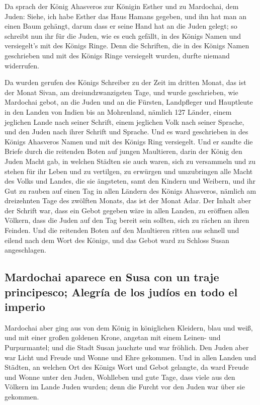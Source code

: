  Da sprach der König Ahasveros zur Königin Esther und zu
Mardochai, dem Juden: Siehe, ich habe Esther das Haus Hamans gegeben,
und ihn hat man an einen Baum gehängt, darum dass er seine Hand hat an
die Juden gelegt;  so schreibt nun ihr für die Juden, wie
es euch gefällt, in des Königs Namen und versiegelt's mit des Königs
Ringe. Denn die Schriften, die in des Königs Namen geschrieben und mit
des Königs Ringe versiegelt wurden, durfte niemand widerrufen.

 Da wurden gerufen des Königs Schreiber zu der Zeit im
dritten Monat, das ist der Monat Sivan, am dreiundzwanzigsten Tage, und
wurde geschrieben, wie Mardochai gebot, an die Juden und an die Fürsten,
Landpfleger und Hauptleute in den Landen von Indien bis an Mohrenland,
nämlich 127 Länder, einem jeglichen Lande nach seiner Schrift, einem
jeglichen Volk nach seiner Sprache, und den Juden nach ihrer Schrift und
Sprache.  Und es ward geschrieben in des Königs Ahasveros
Namen und mit des Königs Ring versiegelt. Und er sandte die Briefe durch
die reitenden Boten auf jungen Maultieren,  darin der
König den Juden Macht gab, in welchen Städten sie auch waren, sich zu
versammeln und zu stehen für ihr Leben und zu vertilgen, zu erwürgen und
umzubringen alle Macht des Volks und Landes, die sie ängsteten, samt den
Kindern und Weibern, und ihr Gut zu rauben  auf einen Tag
in allen Ländern des Königs Ahasveros, nämlich am dreizehnten Tage des
zwölften Monats, das ist der Monat Adar.  Der Inhalt aber
der Schrift war, dass ein Gebot gegeben wäre in allen Landen, zu
eröffnen allen Völkern, dass die Juden auf den Tag bereit sein sollten,
sich zu rächen an ihren Feinden.  Und die reitenden Boten
auf den Maultieren ritten aus schnell und eilend nach dem Wort des
Königs, und das Gebot ward zu Schloss Susan angeschlagen.

\hypertarget{mardochai-aparece-en-susa-con-un-traje-principesco-alegruxeda-de-los-juduxedos-en-todo-el-imperio}{%
\subsection{Mardochai aparece en Susa con un traje principesco; Alegría
de los judíos en todo el
imperio}\label{mardochai-aparece-en-susa-con-un-traje-principesco-alegruxeda-de-los-juduxedos-en-todo-el-imperio}}

 Mardochai aber ging aus von dem König in königlichen
Kleidern, blau und weiß, und mit einer großen goldenen Krone, angetan
mit einem Leinen- und Purpurmantel; und die Stadt Susan jauchzte und war
fröhlich.  Den Juden aber war Licht und Freude und Wonne
und Ehre gekommen.  Und in allen Landen und Städten, an
welchen Ort des Königs Wort und Gebot gelangte, da ward Freude und Wonne
unter den Juden, Wohlleben und gute Tage, dass viele aus den Völkern im
Lande Juden wurden; denn die Furcht vor den Juden war über sie gekommen.

